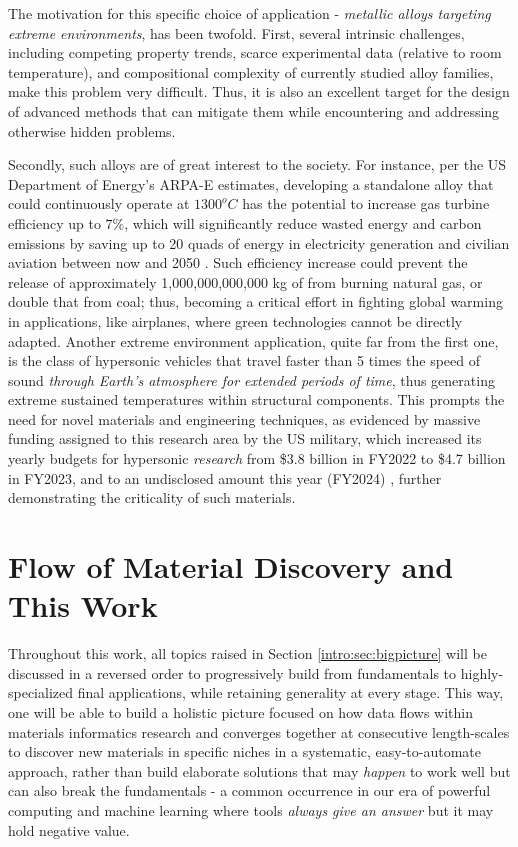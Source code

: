 The motivation for this specific choice of application - \emph{metallic alloys targeting extreme environments}, has been twofold. First, several intrinsic challenges, including competing property trends, scarce experimental data (relative to room temperature), and compositional complexity of currently studied alloy families, make this problem very difficult. Thus, it is also an excellent target for the design of advanced methods that can mitigate them while encountering and addressing otherwise hidden problems.

Secondly, such alloys are of great interest to the society. For instance, per the US Department of Energy's ARPA-E estimates, developing a standalone alloy that could continuously operate at $1300^oC$ has the potential to increase gas turbine efficiency up to $7\%$, which will significantly reduce wasted energy and carbon emissions by saving up to 20 quads of energy in electricity generation and civilian aviation between now and 2050 \cite{ULTIMATEArpa-e.energy.gov}. Such efficiency increase could prevent the release of approximately 1,000,000,000,000 kg of  from burning natural gas, or double that from coal; thus, becoming a critical effort in fighting global warming in applications, like airplanes, where green technologies cannot be directly adapted. Another extreme environment application, quite far from the first one, is the class of hypersonic vehicles that travel faster than 5 times the speed of sound \emph{through Earth's atmosphere for extended periods of time}, thus generating extreme sustained temperatures within structural components. This prompts the need for novel materials and engineering techniques, as evidenced by massive funding assigned to this research area by the US military, which increased its yearly budgets for hypersonic \emph{research} from \$3.8 billion in FY2022 to \$4.7 billion in FY2023, and to an undisclosed amount this year (FY2024) \cite{Sayler2024HypersonicCongress}, further demonstrating the criticality of such materials.


\section{Flow of Material Discovery and This Work} \label{intro:sec:flow}

Throughout this work, all topics raised in Section \ref{intro:sec:bigpicture} will be discussed in a reversed order to progressively build from fundamentals to highly-specialized final applications, while retaining generality at every stage. This way, one will be able to build a holistic picture focused on how data flows within materials informatics research and converges together at consecutive length-scales to discover new materials in specific niches in a systematic, easy-to-automate approach, rather than build elaborate solutions that may \emph{happen} to work well but can also break the fundamentals - a common occurrence in our era of powerful computing and machine learning where tools \emph{always give an answer} but it may hold negative value.

